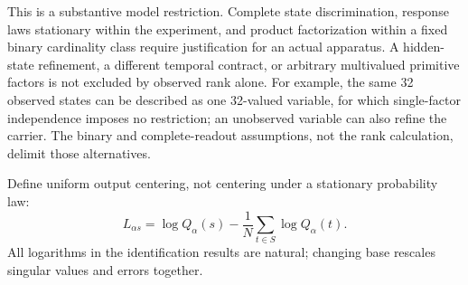 \documentclass[11pt]{article}
\theoremstyle{definition}\newtheorem{definition}[theorem]{Definition}
\theoremstyle{remark}\newtheorem{remark}[theorem]{Remark}
\begin{document}
This is a substantive model restriction. Complete state discrimination, response laws stationary within the experiment, and product factorization within a fixed binary cardinality class require justification for an actual apparatus. A hidden-state refinement, a different temporal contract, or arbitrary multivalued primitive factors is not excluded by observed rank alone. For example, the same 32 observed states can be described as one 32-valued variable, for which single-factor independence imposes no restriction; an unobserved variable can also refine the carrier. The binary and complete-readout assumptions, not the rank calculation, delimit those alternatives.

Define uniform output centering, not centering under a stationary probability law:
\begin{equation}
L_{\alpha s}=\log Q_\alpha(s)-\frac1N\sum_{t\in S}\log Q_\alpha(t).\label{eq:L}
\end{equation}
All logarithms in the identification results are natural; changing base rescales singular values and errors together.
\end{document}
